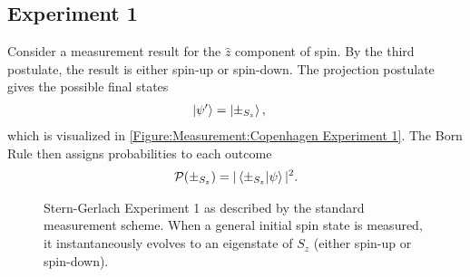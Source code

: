 \subsection{Experiment 1}\label{Standard Experiment 1}
Consider a measurement result for the $\hat{z}$ component of spin. By the third postulate, the result is either spin-up or spin-down. The projection postulate gives the possible final states
\begin{align}
  \ket{\psi'} &= \ket{\pm_{S_z}},
\end{align}
which is visualized in \autoref{Figure:Measurement:Copenhagen Experiment 1}. The Born Rule then assigns probabilities to each outcome
\begin{align}
  \mathcal{P}(\pm_{S_z}) = |\braket{\pm_{S_z} | \psi}|^2 .
\end{align}

\begin{figure}
\centering\CaptionFontSize
{}

\caption[Standard approach to Stern-Gerlach Experiment 1]
{Stern-Gerlach Experiment 1 as described by the standard measurement scheme. When a general initial spin state is measured, it instantaneously evolves to an eigenstate of $S_z$ (either spin-up or spin-down). }
\label{Figure:Measurement:Copenhagen Experiment 1}
\end{figure}

